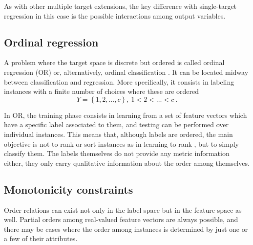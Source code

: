 \documentclass[
	fontsize=11pt, %
	twoside=false, %
	open=any, %
	secnumdepth=1, %
]{kaobook}
\begin{document}
As with other multiple target extensions, the key difference with single-target regression in this case is the possible interactions among output variables.

  
\subsection{Ordinal regression}

A problem where the target space is discrete but ordered is called ordinal regression (OR) or, alternatively, ordinal classification \cite{ord-survey}. It can be located midway between classification and regression. More specifically, it consists in labeling instances with a finite number of choices where these are ordered
\begin{equation}
Y=\left\{1,2,\dots,c\right\},~1<2<\dots<c~.
\end{equation}

In OR, the training phase consists in learning from a set of feature vectors which have a specific label associated to them, and testing can be performed over individual instances. This means that, although labels are ordered, the main objective is not to rank or sort instances as in learning to rank \cite{ltr}, but to simply classify them. The labels themselves do not provide any metric information either, they only carry qualitative information about the order among themselves.

\subsection{Monotonicity constraints}

Order relations can exist not only in the label space but in the feature space as well. Partial orders among real-valued feature vectors are always possible, and there may be cases where the order among instances is determined by just one or a few of their attributes.
\end{document}

